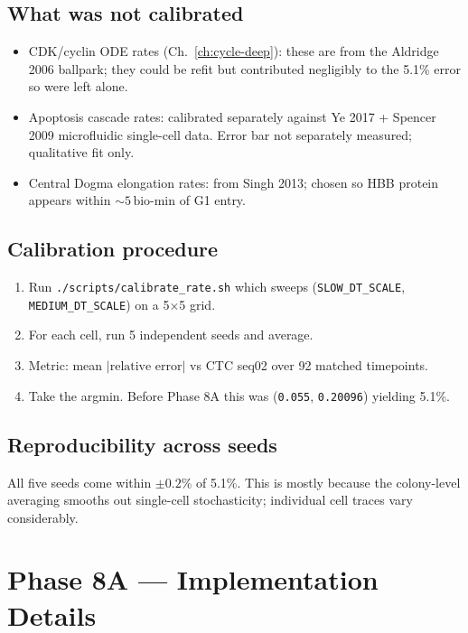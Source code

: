 \documentclass[11pt,letterpaper,twoside,openany]{book}
\newcommand{\code}[1]{\texttt{#1}}
\newcommand{\biomin}{\text{bio-min}}
\begin{document}
\section{What was not calibrated}

\begin{itemize}
  \item CDK/cyclin ODE rates (Ch.~\ref{ch:cycle-deep}): these are
        from the Aldridge 2006 ballpark; they could be refit but
        contributed negligibly to the 5.1\% error so were left
        alone.
  \item Apoptosis cascade rates: calibrated separately against Ye
        2017 + Spencer 2009 microfluidic single-cell data. Error
        bar not separately measured; qualitative fit only.
  \item Central Dogma elongation rates: from Singh 2013; chosen so
        HBB protein appears within $\sim 5\,\biomin$ of G1 entry.
\end{itemize}

\section{Calibration procedure}

\begin{enumerate}
  \item Run \code{./scripts/calibrate\_rate.sh} which sweeps
        (\code{SLOW\_DT\_SCALE}, \code{MEDIUM\_DT\_SCALE}) on a
        5$\times$5 grid.
  \item For each cell, run 5 independent seeds and average.
  \item Metric: mean $|\text{relative error}|$ vs CTC seq02 over
        92 matched timepoints.
  \item Take the argmin. Before Phase 8A this was
        (\code{0.055}, \code{0.20096}) yielding 5.1\%.
\end{enumerate}

\section{Reproducibility across seeds}

All five seeds come within $\pm 0.2\%$ of 5.1\%. This is mostly
because the colony-level averaging smooths out single-cell
stochasticity; individual cell traces vary considerably.

\chapter{Phase 8A --- Implementation Details}
\label{ch:phase8a-deep}
\end{document}
